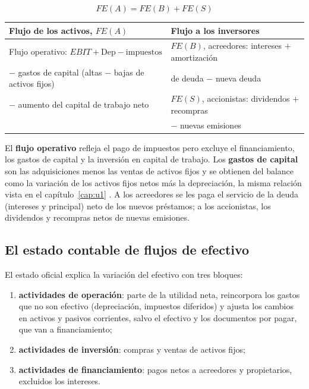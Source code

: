 \begin{formulaBox}
\[
FE(A) = FE(B) + FE(S)
\]
\begin{center}
\small
\begin{tabular}{@{}l@{\qquad}l@{}}
\toprule
\textbf{Flujo de los activos, $FE(A)$} & \textbf{Flujo a los inversores}\\
\midrule
Flujo operativo: $EBIT + \text{Dep} - \text{impuestos}$ & $FE(B)$, acreedores: intereses $+$ amortización \\
$-$ gastos de capital (altas $-$ bajas de activos fijos) & \quad de deuda $-$ nueva deuda\\
$-$ aumento del capital de trabajo neto & $FE(S)$, accionistas: dividendos $+$ recompras\\
 & \quad $-$ nuevas emisiones\\
\bottomrule
\end{tabular}
\end{center}
\end{formulaBox}

El \textbf{flujo operativo} refleja el pago de impuestos pero excluye el financiamiento, los gastos de capital y la inversión en capital de trabajo. Los \textbf{gastos de capital} son las adquisiciones menos las ventas de activos fijos y se obtienen del balance como la variación de los activos fijos netos más la depreciación, la misma relación vista en el capítulo~\ref{cap:u1} . A los acreedores se les paga el servicio de la deuda (intereses y principal) neto de los nuevos préstamos; a los accionistas, los dividendos y recompras netos de nuevas emisiones.

\subsection{El estado contable de flujos de efectivo}

El estado oficial explica la variación del efectivo con tres bloques:
\begin{enumerate}
\item \textbf{actividades de operación}: parte de la utilidad neta, reincorpora los gastos que no son efectivo (depreciación, impuestos diferidos) y ajusta los cambios en activos y pasivos corrientes, salvo el efectivo y los documentos por pagar, que van a financiamiento;
\item \textbf{actividades de inversión}: compras y ventas de activos fijos;
\item \textbf{actividades de financiamiento}: pagos netos a acreedores y propietarios, excluidos los intereses.
\end{enumerate}

